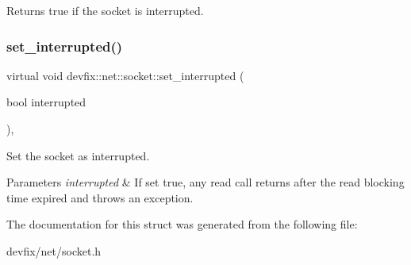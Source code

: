 \begin{DoxyReturn}{Returns}
true if the socket is interrupted. 
\end{DoxyReturn}
\mbox{\label{structdevfix_1_1net_1_1socket_a3fa8d7dcd44e7740b29ad6674005eb5d}} 
\subsubsection{\texorpdfstring{set\+\_\+interrupted()}{set\_interrupted()}}
{\footnotesize\ttfamily virtual void devfix\+::net\+::socket\+::set\+\_\+interrupted (\begin{DoxyParamCaption}\item[{bool}]{interrupted }\end{DoxyParamCaption})\hspace{0.3cm}{\ttfamily [pure virtual]}, {\ttfamily [noexcept]}}

Set the socket as interrupted. 
\begin{DoxyParams}{Parameters}
{\em interrupted} & If set true, any read call returns after the read blocking time expired and throws an exception. \\
\hline
\end{DoxyParams}


The documentation for this struct was generated from the following file\+:\begin{DoxyCompactItemize}
\item 
devfix/net/socket.\+h\end{DoxyCompactItemize}
